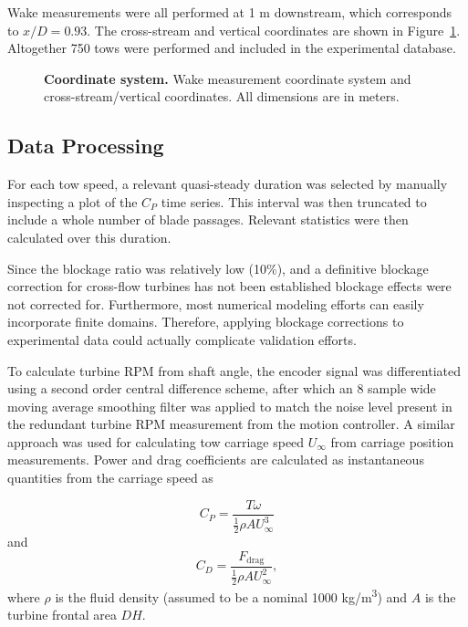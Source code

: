Wake measurements were all performed at 1 m downstream, which corresponds to
$x/D = 0.93$. The cross-stream and vertical coordinates are shown in
Figure~\ref{fig:coordinates}. Altogether 750 tows were performed and included in
the experimental database.

\begin{figure}
    
    \caption{{\bf Coordinate system.} Wake measurement coordinate system and
        cross-stream/vertical coordinates. All dimensions are in meters.}
    
    \label{fig:coordinates}
\end{figure}


\subsection{Data Processing}

For each tow speed, a relevant quasi-steady duration was selected by manually
inspecting a plot of the $C_P$ time series. This interval was then truncated to
include a whole number of blade passages. Relevant statistics were then
calculated over this duration.

Since the blockage ratio was relatively low (10\%), and a definitive blockage
correction for cross-flow turbines has not been established \cite{Cavagnaro2014}
blockage effects were not corrected for. Furthermore, most numerical modeling
efforts can easily incorporate finite domains. Therefore, applying blockage
corrections to experimental data could actually complicate validation efforts.

To calculate turbine RPM from shaft angle, the encoder signal was differentiated
using a second order central difference scheme, after which an 8 sample wide
moving average smoothing filter was applied to match the noise level present in
the redundant turbine RPM measurement from the motion controller. A similar
approach was used for calculating tow carriage speed $U_\infty$ from carriage
position measurements. Power and drag coefficients are calculated as
instantaneous quantities from the carriage speed as

\begin{equation}
    C_P = \frac{T \omega}{\frac{1}{2} \rho A U_\infty^3}
\end{equation}
and
\begin{equation}
    C_D = \frac{F_\mathrm{drag}}{\frac{1}{2} \rho A U_\infty^2},
\end{equation}
where $\rho$ is the fluid density (assumed to be a nominal 1000
kg/m\textsuperscript{3}) and $A$ is the turbine frontal area $DH$.

